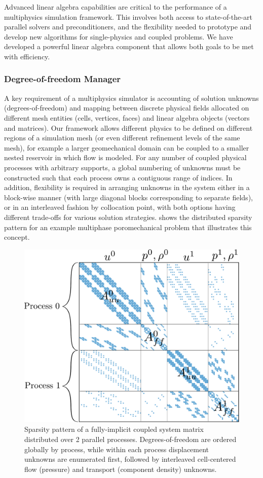Advanced linear algebra capabilities are critical to the performance of a multiphysics simulation framework.   This involves both access to state-of-the-art parallel solvers and preconditioners, and the flexibility needed to prototype and develop new algorithms for single-physics and coupled problems.   We have developed a powerful linear algebra component that allows both goals to be met with efficiency.

\subsubsection{Degree-of-freedom Manager}

A key requirement of a multiphysics simulator is accounting of solution unknowns (degrees-of-freedom) and mapping between discrete physical fields allocated on different mesh entities (cells, vertices, faces) and linear algebra objects (vectors and matrices).   Our framework allows different physics to be defined on different regions of a simulation mesh (or even different refinement levels of the same mesh), for example a larger geomechanical domain can be coupled to a smaller nested reservoir in which flow is modeled.   For any number of coupled physical processes with arbitrary supports, a global numbering of unknowns must be constructed such that each process owns a contiguous range of indices.   In addition, flexibility is required in arranging unknowns in the system either in a block-wise manner (with large diagonal blocks corresponding to separate fields), or in an interleaved fashion by collocation point, with both options having different trade-offs for various solution strategies.    shows the distributed sparsity pattern for an example multiphase poromechanical problem that illustrates this concept.

\begin{figure} [htbp]
  \centerline{\includegraphics[width=0.5\linewidth]{figs/GEOSX/coupled_system_parallel_sparsity}}
  \caption[Sparsity pattern of a distributed multi-physics system matrix]{\label{fig:coupled_sparsity_parallel} Sparsity pattern of a fully-implicit coupled system matrix distributed over 2 parallel processes.   Degrees-of-freedom are ordered globally by process, while within each process displacement unknowns are enumerated first, followed by interleaved cell-centered flow (pressure) and transport (component density) unknowns.}
\end{figure}

